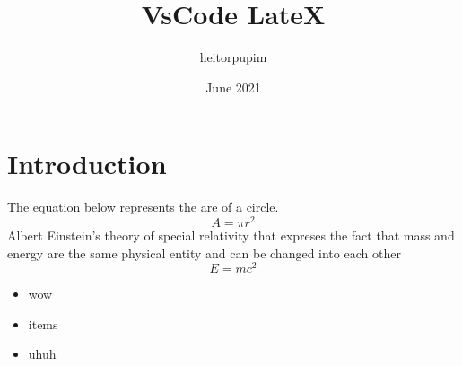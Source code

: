 \documentclass{article}
\title{VsCode LateX}
\author{heitorpupim}
\date{June 2021}
\begin{document}
\maketitle

\section{Introduction}
The equation below represents the are of a circle.
\begin{equation}
    A = \pi r^2
\end{equation}
Albert Einstein's theory of special relativity that expreses the fact that mass and energy are the same physical entity and can be changed into each other
\begin{equation}
    E = mc^2
\end{equation}
\begin{itemize}
    \item wow
    \item items
    \item uhuh
\end{itemize}
\end{document}
